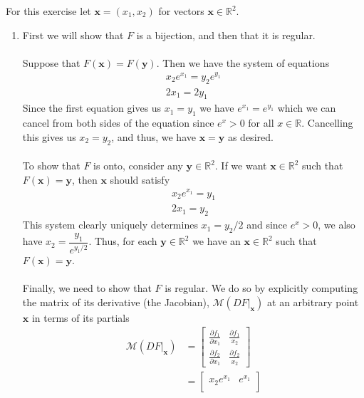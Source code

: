 \documentclass[12 pt, letterpaper]{hmcpset}
\begin{document}
\begin{solution}
	For this exercise let $\mathbf{x} = (x_1, x_2)$ for vectors $\mathbf{x} \in \mathbb{R}^2$.	
	\begin{enumerate}
		\item	
			First we will show that $F$ is a bijection, and then that it is regular. \\\\
			Suppose that $F(\mathbf{x}) = F(\mathbf{y})$. Then we have the system of equations
			\[
				\begin{gathered}
					x_2 e^{x_1} = y_2 e^{y_1} \\
					2 x_1 = 2 y_1
				\end{gathered}
			\]
			Since the first equation gives us $x_1 = y_1$ we have $e^{x_1} = e^{y_1}$ which we can cancel from both sides of the equation since $e^x > 0$ for all $x \in \mathbb{R}$. Cancelling this gives us $x_2 = y_2$, and thus, we have $\mathbf{x} = \mathbf{y}$ as desired. \\\\
			To show that $F$ is onto, consider any $\mathbf{y} \in \mathbb{R}^2$. If we want $\mathbf{x} \in \mathbb{R}^2$ such that $F(\mathbf{x}) = \mathbf{y}$, then $\mathbf{x}$ should satisfy
			\[
				\begin{gathered}
					x_2 e^{x_1} = y_1 \\
					2 x_1 = y_2
				\end{gathered}
			\]
			This system clearly uniquely determines $x_1 = y_2/2$ and since $e^x > 0$, we also have $x_2 = \dfrac{y_1}{e^{y_1/2}}$. Thus, for each $\mathbf{y} \in \mathbb{R}^2$ we have an $\mathbf{x} \in \mathbb{R}^2$ such that $F(\mathbf{x}) = \mathbf{y}$. \\\\
			Finally, we need to show that $F$ is regular. We do so by explicitly computing the matrix of its derivative (the Jacobian), $\mathcal{M} (DF \Big |_{\mathbf{x}})$ at an arbitrary point $\mathbf{x}$ in terms of its partials
			\[
				\begin{split}
					\mathcal{M} (DF \Big |_{\mathbf{x}}) & = \begin{bmatrix}
						\frac{\partial f_1}{\partial x_1} & \frac{\partial f_1}{x_2} \\
						\frac{\partial f_2}{\partial x_1} & \frac{\partial f_2}{x_2}
					\end{bmatrix} \\
									    & = \begin{bmatrix}
						x_2 e^{x_1} & e^{x_1} \\

\end{bmatrix}
\end{split}\]
\end{enumerate}
\end{solution}
\end{document}
